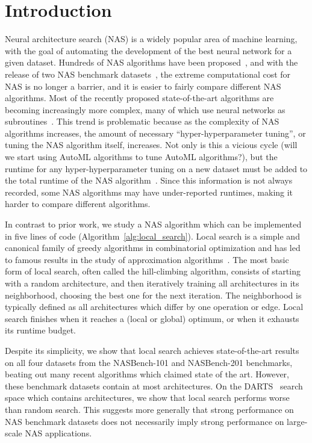 \documentclass[11pt]{article}
\let\citep\cite
\numberwithin{equation}{section}
\numberwithin{figure}{section}
\theoremstyle{plain}
\theoremstyle{definition}
\begin{document}
\section{Introduction} \label{sec:intro}
Neural architecture search (NAS) is a widely popular area of machine learning, 
with the
goal of automating the development of the best neural network for a given dataset.
Hundreds of NAS algorithms have been proposed~\citep{nas-survey,zoph2017neural}, and
with the release of two NAS benchmark datasets~\citep{nasbench201, nasbench},
the extreme computational cost for NAS is no longer a barrier, 
and it is easier to fairly compare different NAS algorithms.
Most of the recently proposed state-of-the-art algorithms are becoming increasingly more
complex, many of which use neural networks as subroutines~\citep{wen2019neural, bananas}.
This trend is problematic because as the complexity of NAS algorithms increases, 
the amount of
necessary ``hyper-hyperparameter tuning'', or tuning the NAS algorithm itself, increases.
Not only is this a vicious cycle (will we start using AutoML algorithms to tune AutoML algorithms?),
but the runtime for any hyper-hyperparameter tuning on a new dataset
must be added to the total runtime of the NAS algorithm~\citep{lindauer2019best, yang2019evaluation}.
Since this information is not always recorded, some NAS algorithms may have under-reported runtimes, making it harder to compare different algorithms.


In contrast to prior work, we study a NAS algorithm which can be implemented in five lines
of code (Algorithm~\ref{alg:local_search}).
Local search is a simple and canonical family of greedy algorithms in combinatorial optimization 
and has led to famous results in the study of approximation 
algorithms~\citep{cohen2016local, friggstad2019local, michiels2007theoretical}.
The most basic form of local search, often called the hill-climbing algorithm,
consists of starting with a random architecture, 
and then iteratively training all architectures in its neighborhood, 
choosing the best one for the next iteration.
The neighborhood is typically defined as all architectures which differ by one 
operation or edge.
Local search finishes when it reaches a (local or global) optimum,
or when it exhausts its runtime budget.


Despite its simplicity, we show that local search achieves state-of-the-art 
results on all four datasets from the NASBench-101 and NASBench-201 benchmarks,
beating out many recent algorithms which claimed state of the art.
However, these benchmark datasets contain at most  architectures.
On the DARTS~\citep{darts} search space which contains  architectures,
we show that local search performs worse than random search.
This suggests more generally that strong performance on NAS benchmark datasets 
does not necessarily imply strong performance on large-scale NAS applications.
\end{document}

